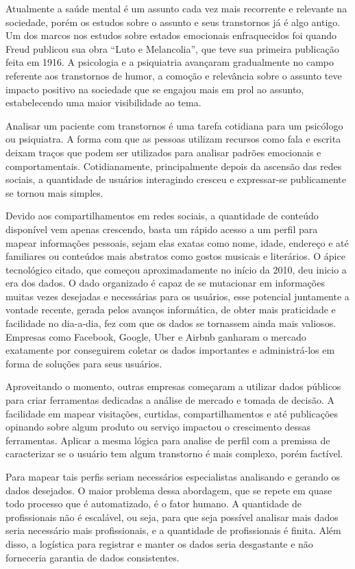Atualmente a saúde mental é um assunto cada vez mais recorrente e relevante na sociedade, porém os estudos sobre o assunto e seus transtornos já é algo antigo. Um dos marcos nos estudos sobre estados emocionais enfraquecidos foi quando Freud publicou sua obra “Luto e Melancolia”, que teve sua primeira publicação feita em 1916. A psicologia e a psiquiatria avançaram gradualmente no campo referente aos transtornos de humor, a comoção e relevância sobre o assunto teve impacto positivo na sociedade que se engajou mais em prol ao assunto, estabelecendo uma maior visibilidade ao tema.

Analisar um paciente com transtornos é uma tarefa cotidiana para um psicólogo ou psiquiatra. A forma com que as pessoas utilizam recursos como fala e escrita deixam traços que podem ser utilizados para analisar padrões emocionais e comportamentais. Cotidianamente, principalmente depois da ascensão das redes sociais, a quantidade de usuários interagindo cresceu e expressar-se publicamente se tornou mais simples.

Devido aos compartilhamentos em redes sociais, a quantidade de conteúdo disponível vem apenas crescendo, basta um rápido acesso a um perfil para mapear informações pessoais, sejam elas exatas como nome, idade, endereço e até familiares ou conteúdos mais abstratos como gostos musicais e literários. O ápice tecnológico citado, que começou aproximadamente no início da 2010, deu inicio a era dos dados. O dado organizado é capaz de se mutacionar em informações muitas vezes desejadas e necessárias para os usuários, esse potencial juntamente a vontade recente, gerada pelos avanços informática, de obter mais praticidade e facilidade no dia-a-dia, fez com que os dados se tornassem ainda mais valiosos. Empresas como Facebook, Google, Uber e Airbnb ganharam o mercado exatamente por conseguirem coletar os dados importantes e administrá-los em forma de soluções para seus usuários.

Aproveitando o momento, outras empresas começaram a utilizar dados públicos para criar ferramentas dedicadas a análise de mercado e tomada de decisão. A facilidade em mapear visitações, curtidas, compartilhamentos e até publicações opinando sobre algum produto ou serviço impactou o crescimento dessas ferramentas. Aplicar a mesma lógica para analise de perfil com a premissa de caracterizar se o usuário tem algum transtorno é mais complexo, porém factível.

Para mapear tais perfis seriam necessários especialistas analisando e gerando os dados desejados. O maior problema dessa abordagem, que se repete em quase todo processo que é automatizado, é o fator humano. A quantidade de profissionais não é escalável, ou seja, para que seja possível analisar mais dados seria necessário mais profissionais, e a quantidade de profissionais é finita. Além disso, a logística para registrar e manter os dados seria desgastante e não forneceria garantia de dados consistentes.

